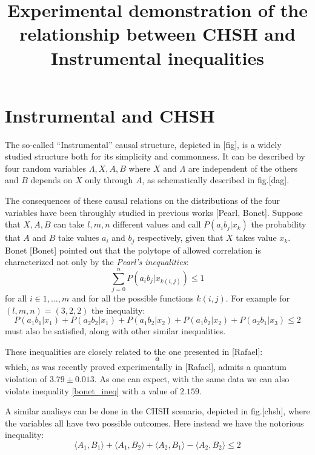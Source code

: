 \documentclass{article}
\title{Experimental demonstration of the relationship between CHSH and Instrumental inequalities}
\newcommand{\avg}[1]{\langle#1\rangle}
\begin{document}
\maketitle

\section*{Instrumental and CHSH}
The so-called ``Instrumental'' causal structure, depicted in [fig], is a widely studied
structure both for its simplicity and commonness.
It can be described by four random variables $\Lambda, X, A, B$ where $X$ and
$\Lambda$ are independent of the others and $B$ depends on $X$ only through $A$,
as schematically described in fig.[dag].

The consequences of these causal relations on the distributions of the four
variables have been throughly studied in previous works [Pearl, Bonet].
Suppose that $X, A, B$ can take $l,m,n$ different values and 
call $P(a_i b_j | x_k)$ the probability that $A$ and $B$ take values $a_i$
and $b_j$ respectively, given that $X$ takes value $x_k$.
Bonet [Bonet] pointed out that the polytope of allowed
correlation is characterized not only by the \emph{Pearl's inequalities}:
\begin{equation}
    \sum_{j=0}^{n} P(a_i b_j|x_{k(i,j)}) \le 1
    \label{eq:pearl_ineq}
\end{equation}
for all $i \in {1,\ldots, m}$ and for all the possible functions $k(i,j)$.
For example for $(l,m,n) = (3,2,2)$ the inequality:
\begin{equation}
    P(a_1 b_1 | x_1) + P(a_2 b_2 | x_1) + 
    P(a_1 b_2 | x_2) + P(a_1 b_2 | x_2) + 
    P(a_2 b_1 | x_3) \le 2
    \label{eq:bonet_ineq}
\end{equation}
must also be satisfied, along with other similar inequalities.

These inequalities are closely related to the one presented in [Rafael]:
\begin{equation}
a    
    \label{eq:rafael_ineq}
\end{equation}
which, as was recently proved experimentally in [Rafael], admits a quantum violation
of $3.79 \pm 0.013$.
As one can expect, with the same data we can also violate inequality
\eqref{bonet_ineq} with a value of $2.159$.

A similar analisys can be done in the CHSH scenario, depicted in fig.[chsh],
where the variables all have two possible outcomes.
Here instead we have the notorious inequality:
\begin{equation}
    \avg{A_1, B_1} + \avg{A_1, B_2} + \avg{A_2, B_1} - \avg{A_2, B_2} \le 2
    \label{eq:chsh_ineq}
\end{equation}
\end{document}

